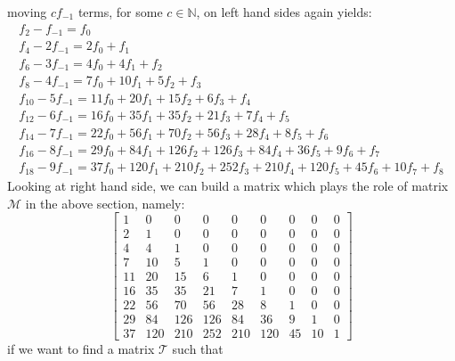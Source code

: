 \documentclass[a4paper,dottedtoc,headinclude,footinclude]{report} %
\theoremstyle{plain}
\begin{document}
    moving $c f_{-1}$ terms, for some $c\in\mathbb{N}$, on left hand sides again yields:
    \begin{displaymath}
        \begin{array}{c}
            f_{2} - f_{-1}= f_{0}\\
            f_{4} -2 f_{-1} = 2 f_{0} + f_{1}\\
            f_{6} -3 f_{-1} = 4 f_{0} + 4 f_{1} + f_{2}\\
            f_{8} -4 f_{-1} = 7 f_{0} + 10 f_{1} + 5 f_{2} + f_{3}\\
            f_{10} -5 f_{-1} = 11 f_{0} + 20 f_{1} + 15 f_{2} + 6 f_{3} + f_{4}\\
            f_{12} -6 f_{-1} = 16 f_{0} + 35 f_{1} + 35 f_{2} + 21 f_{3} + 7 f_{4} + f_{5}\\
            f_{14} -7 f_{-1} = 22 f_{0} + 56 f_{1} + 70 f_{2} + 56 f_{3} + 28 f_{4} + 8 f_{5} + f_{6}\\
            f_{16} -8 f_{-1} = 29 f_{0} + 84 f_{1} + 126 f_{2} + 126 f_{3} + 84 f_{4} + 36 f_{5} + 9 f_{6} + f_{7}\\
            f_{18} -9 f_{-1} = 37 f_{0} + 120 f_{1} + 210 f_{2} + 252 f_{3} + 210 f_{4} + 120 f_{5} + 45 f_{6} + 10 f_{7} + f_{8}
            \end{array}
    \end{displaymath}
    Looking at right hand side, we can build a matrix which plays the role
    of matrix $\mathcal{M}$ in the above section, namely:
    \begin{displaymath}
        \left[\begin{array}{ccccccccc}
            1 & 0 & 0 & 0 & 0 & 0 & 0 & 0 & 0\\
            2 & 1 & 0 & 0 & 0 & 0 & 0 & 0 & 0\\
            4 & 4 & 1 & 0 & 0 & 0 & 0 & 0 & 0\\
            7 & 10 & 5 & 1 & 0 & 0 & 0 & 0 & 0\\
            11 & 20 & 15 & 6 & 1 & 0 & 0 & 0 & 0\\
            16 & 35 & 35 & 21 & 7 & 1 & 0 & 0 & 0\\
            22 & 56 & 70 & 56 & 28 & 8 & 1 & 0 & 0\\
            29 & 84 & 126 & 126 & 84 & 36 & 9 & 1 & 0\\
            37 & 120 & 210 & 252 & 210 & 120 & 45 & 10 & 1
            \end{array}\right]
    \end{displaymath}
    if we want to find a matrix $\mathcal{T}$ such that 
\end{document}
